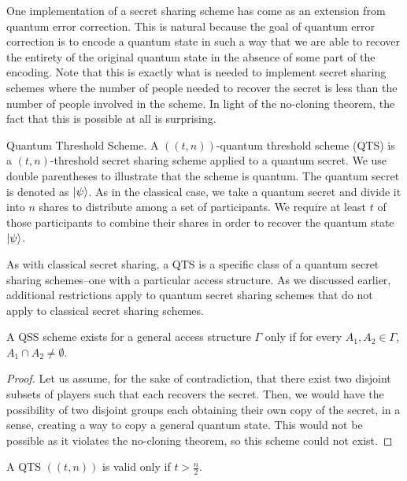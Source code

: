 One implementation of a secret sharing scheme has come as an extension from quantum error correction. This is natural because the goal of quantum error correction is to encode a quantum state in such a way that we are able to recover the entirety of the original quantum state in the absence of some part of the encoding. Note that this is exactly what is needed to implement secret sharing schemes where the number of people needed to recover the secret is less than the number of people involved in the scheme. In light of the no-cloning theorem, the fact that this is possible at all is surprising. 

\begin{definition}{Quantum Threshold Scheme.}
    \label{defn:qts}
    A $((t,n))$-quantum threshold scheme (QTS) is a $(t,n)$-threshold secret sharing scheme applied to a quantum secret. We use double parentheses to illustrate that the scheme is quantum. The quantum secret is denoted as $\ket{\psi}$. As in the classical case, we take a quantum secret and divide it into $n$ shares to distribute among a set of participants. We require at least $t$ of those participants to combine their shares in order to recover the quantum state $\ket{\psi}$.
\end{definition}

As with classical secret sharing, a QTS is a specific class of a quantum secret sharing schemes--one with a particular access structure. As we discussed earlier, additional restrictions apply to quantum secret sharing schemes that do not apply to classical secret sharing schemes.

\begin{theorem}
    \label{thm:qss-disjoint}
    A QSS scheme exists for a general access structure $\Gamma$ only if for every $A_1, A_2 \in \Gamma$, $A_1 \cap A_2 \neq \emptyset$.
\end{theorem}

\begin{proof}
    Let us assume, for the sake of contradiction, that there exist two disjoint subsets of players such that each recovers the secret. Then, we would have the possibility of two disjoint groups each obtaining their own copy of the secret, in a sense, creating a way to copy a general quantum state. This would not be possible as it violates the no-cloning theorem, so this scheme could not exist.
\end{proof}

\begin{corollary}
    \label{cor:qts}
    A QTS $((t,n))$ is valid only if $t > \frac{n}{2}$.
\end{corollary}

